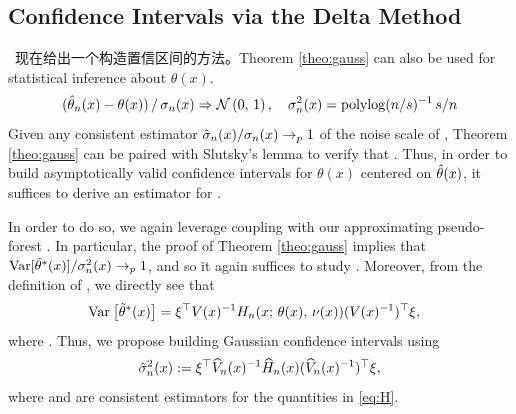 \documentclass[aos]{imsart}
\theoremstyle{plain}
\theoremstyle{definition}
\theoremstyle{remark}
\begin{document}
\begin{CJK}{UTF8}{gbsn}
\newpage

\section{Confidence Intervals via the Delta Method}
\label{sec:delta_method}
\, 现在给出一个构造置信区间的方法。Theorem \ref{theo:gauss} can also be used for statistical inference about $\theta(x)$. 
\begin{equation*}
(\htheta_n(x) - \theta(x)) \, /\, \sigma_n(x) \Rightarrow \nn\p{0, \, 1}, \quad
\sigma^2_n(x) = \operatorname{polylog}(n/s)^{-1} \, s/n
\end{equation*}
Given any
consistent estimator $\hat{\sigma}_n(x)/\sigma_n(x) \rightarrow_p 1$ of the noise scale
of , Theorem \ref{theo:gauss} can be paired with Slutsky's lemma
to verify that
.
Thus, in order to build asymptotically valid confidence intervals for $\theta(x)$ centered on $\hat{\theta}(x)$,
it suffices to derive an estimator for .

In order to do so, we again leverage coupling with our approximating pseudo-forest .
In particular, the proof of Theorem \ref{theo:gauss} implies that 
$\text{Var}[\tilde{\theta}^*(x)]/\sigma^2_n(x) \rightarrow_p 1$, and so it again suffices to study
 . Moreover, from the definition of , we directly see that
\begin{equation}
\label{eq:H}
\begin{split}
&\Var{\ttheta^*(x)} = \xi^\top V(x)^{-1} H_n(x; \, \theta(x), \, \nu(x)) (V(x)^{-1})^\top \xi,
\end{split}
\end{equation}
where .
Thus, we propose building Gaussian confidence intervals using
\begin{equation}
\label{eq:sigma_hat}
\hsigma_n^2(x) := \xi^\top \hV_n(x)^{-1} \hH_n(x) (\hV_n(x)^{-1})^\top \xi,
\end{equation}
where  and  are consistent estimators
for the quantities in \eqref{eq:H}.


\end{CJK}
\end{document}
